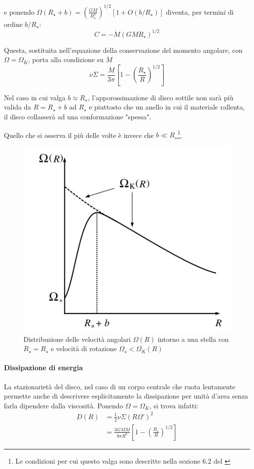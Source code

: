 \documentclass[a4paperbi]{article}
\begin{document}
	e ponendo $\Omega(R_{\star}+b)=\left(\frac{GM}{R_{\star}^3}\right)^{1/2}[1+O(b/R_{\star})]$ diventa, per termini di ordine $b/R_{\star}$:
	\begin{equation}
		C=-\dot{M}(GMR_{\star})^{1/2}
	\end{equation}	

	Questa, sostituita nell'equazione della conservazione del momento angolare, con $\Omega=\Omega_K$, porta alla condizione su $\dot{M}$
	\begin{equation}
		\nu\Sigma=\frac{\dot{M}}{3\pi}\left[1-\left(\frac{R_{\star}}{R}\right)^{1/2}\right]
	\end{equation}
	
	Nel caso in cui valga $b\approx R_{\star}$, l'apporossimazione di disco sottile non sarà più valida da $R=R_{\star}+b$ ad $R_{\star}$ e piuttosto che un anello in cui il materiale rallenta, il disco collasserà ad una conformazione "spessa".
	
	Quello che si osserva il più delle volte è invece che $b\ll R_{\star}$\footnote{Le condizioni per cui questo valga sono descritte nella sezione 6.2 del \cite{FrankKingRaineAccretionPower}}.	
	
	\begin{figure}[H]
		\centering
		\includegraphics[width=0.7\linewidth]{InnerRegionAngularVelocity}
		\caption{Distribuzione delle velocità angolari $\Omega(R)$ intorno a una stella con $R_{\star}=R_\star$ e velocità di rotazione $\Omega_{\star}<\Omega_K(R)$}
		\label{fig:InnerRegionAngularVelocity}
	\end{figure}
	
	\paragraph{Dissipazione di energia}
	La stazionarietà del disco, nel caso di un corpo centrale che ruota lentamente permette anche di descrivere esplicitamente la dissipazione per unità d'area senza farla dipendere dalla viscosità. Ponendo $\Omega=\Omega_K$, si trova infatti:
	\begin{align}
		D(R)&=\frac{1}{2}\nu\Sigma(R\Omega')^2
			\\&=\frac{3GM\dot{M}}{8\pi R^3}\left[1-\left(\frac{R_{\star}}{R}\right)^{1/2}\right]
	\end{align}	
	
\end{document}
